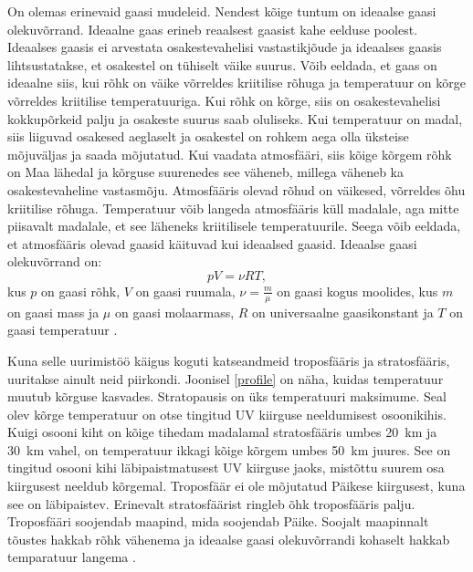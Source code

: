 \documentclass{trkut}%
\begin{document}
On olemas erinevaid gaasi mudeleid. Nendest kõige tuntum on ideaalse gaasi olekuvõrrand. Ideaalne gaas erineb reaalsest gaasist kahe eelduse poolest. Ideaalses gaasis ei arvestata osakestevahelisi vastastikjõude ja ideaalses gaasis lihtsustatakse, et osakestel on tühiselt väike suurus. Võib eeldada, et gaas on ideaalne siis, kui rõhk on väike võrreldes kriitilise rõhuga ja temperatuur on kõrge võrreldes kriitilise temperatuuriga. Kui rõhk on kõrge, siis on osakestevahelisi kokkupõrkeid palju ja osakeste suurus saab oluliseks. Kui temperatuur on madal, siis liiguvad osakesed aeglaselt ja osakestel on rohkem aega olla üksteise mõjuväljas ja saada mõjutatud. Kui vaadata atmosfääri, siis kõige kõrgem rõhk on Maa lähedal ja kõrguse suurenedes see väheneb, millega väheneb ka osakestevaheline vastasmõju. Atmosfääris olevad rõhud on väikesed, võrreldes õhu kriitilise rõhuga. Temperatuur võib langeda atmosfääris küll madalale, aga mitte piisavalt madalale, et see läheneks kriitilisele temperatuurile. Seega võib eeldada, et atmosfääris olevad gaasid käituvad kui ideaalsed gaasid. Ideaalse gaasi olekuvõrrand on:
\begin{equation}\label{eq8}
pV=\nu RT ,
\end{equation}
kus $p$ on gaasi rõhk, $V$ on gaasi ruumala, $\nu = \frac{m}{\mu}$ on gaasi kogus moolides, kus $m$ on gaasi mass ja $\mu$ on gaasi molaarmass, $R$ on universaalne gaasikonstant ja $T$ on gaasi temperatuur \parencite{IGasKhan}.


Kuna selle uurimistöö käigus koguti katseandmeid troposfääris ja stratosfääris, uuritakse ainult neid piirkondi. Joonisel \ref{profile} on näha, kuidas temperatuur muutub kõrguse kasvades. Stratopausis on üks temperatuuri maksimume. Seal olev kõrge temperatuur on otse tingitud UV kiirguse neeldumisest osoonikihis. Kuigi osooni kiht on kõige tihedam madalamal stratosfääris umbes \SI{20}{km} ja \SI{30}{km} vahel, on temperatuur ikkagi kõige kõrgem umbes \SI{50}{km} juures. See on tingitud osooni kihi läbipaistmatusest UV kiirguse jaoks, mistõttu suurem osa kiirgusest neeldub kõrgemal. Troposfäär ei ole mõjutatud Päikese kiirgusest, kuna see on läbipaistev. Erinevalt stratosfäärist ringleb õhk troposfääris palju. Troposfääri soojendab maapind, mida soojendab Päike. Soojalt maapinnalt tõustes hakkab rõhk vähenema ja ideaalse gaasi olekuvõrrandi kohaselt hakkab temparatuur langema \parencite[24--26]{book:779878}.
\end{document}
